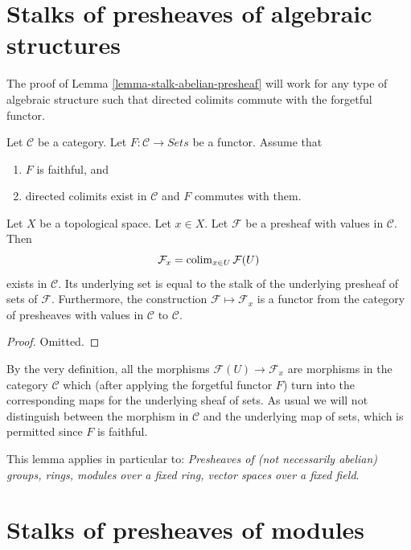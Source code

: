 \section{Stalks of presheaves of algebraic structures}
\label{section-stalks-presheaves-structures}

\noindent
The proof of Lemma \ref{lemma-stalk-abelian-presheaf} will work
for any type of algebraic structure such that directed
colimits commute with the forgetful functor.

\begin{lemma}
\label{lemma-stalk-presheaf-values-in-category}
Let $\mathcal{C}$ be a category. Let $F : \mathcal{C} \to \textit{Sets}$
be a functor. Assume that
\begin{enumerate}
\item $F$ is faithful, and
\item directed colimits exist in $\mathcal{C}$ and $F$ commutes with
them.
\end{enumerate}
Let $X$ be a topological space. Let $x \in X$. Let $\mathcal{F}$
be a presheaf with values in $\mathcal{C}$.
Then
$$
\mathcal{F}_x = \mathop{\mathrm{colim}}\nolimits_{x\in U} \mathcal{F}(U)
$$
exists in $\mathcal{C}$. Its underlying set is equal to the
stalk of the underlying presheaf of sets of $\mathcal{F}$.
Furthermore, the construction $\mathcal{F} \mapsto \mathcal{F}_x$
is a functor from the category of presheaves with values in
$\mathcal{C}$ to $\mathcal{C}$.
\end{lemma}

\begin{proof}
Omitted.
\end{proof}

\noindent
By the very definition, all the morphisms $\mathcal{F}(U)
\to \mathcal{F}_x$ are morphisms in the category $\mathcal{C}$
which (after applying the forgetful functor $F$) turn into
the corresponding maps for the underlying sheaf of sets.
As usual we will not distinguish between the morphism
in $\mathcal{C}$ and the underlying map of sets, which
is permitted since $F$ is faithful.

\medskip\noindent
This lemma applies in particular to:
{\it Presheaves of (not necessarily abelian) groups, rings, modules
over a fixed ring, vector spaces over a fixed field}.

\section{Stalks of presheaves of modules}
\label{section-stalk-presheaves-modules}


